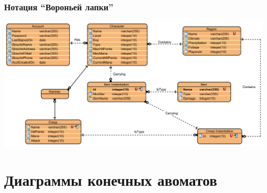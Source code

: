 \documentclass[xetex,mathserif,serif]{beamer}
\begin{document}
    \begin{frame}
        \frametitle{Нотация ``Вороньей лапки''}
        \begin{center}
            \includegraphics[width=\textwidth]{erCrowsFoot.png}
        \end{center}
    \end{frame}

    \section{Диаграммы конечных авоматов}
\end{document}
